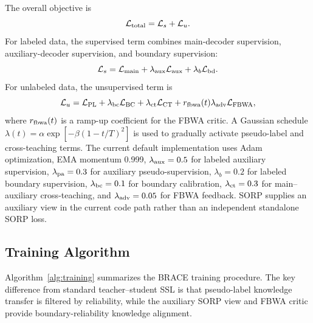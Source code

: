 \documentclass[a4paper,fleqn]{cas-dc}
\begin{document}
The overall objective is
\begin{equation}
\mathcal{L}_{\rm total}=\mathcal{L}_{s}+\mathcal{L}_{u}.
\end{equation}
For labeled data, the supervised term combines main-decoder supervision, auxiliary-decoder supervision, and boundary supervision:
\begin{equation}
\mathcal{L}_{s}=\mathcal{L}_{\rm main}+\lambda_{\rm aux}\mathcal{L}_{\rm aux}+\lambda_b\mathcal{L}_{\rm bd}.
\end{equation}
For unlabeled data, the unsupervised term is
\begin{equation}
\mathcal{L}_{u}=\mathcal{L}_{\rm PL}+\lambda_{\rm bc}\mathcal{L}_{\rm BC}+\lambda_{\rm ct}\mathcal{L}_{\rm CT}+r_{\rm fbwa}(t)\lambda_{\rm adv}\mathcal{L}_{\rm FBWA},
\end{equation}
where $r_{\rm fbwa}(t)$ is a ramp-up coefficient for the FBWA critic. A Gaussian schedule $\lambda(t)=\alpha\exp[-\beta(1-t/T)^2]$ is used to gradually activate pseudo-label and cross-teaching terms. The current default implementation uses Adam optimization, EMA momentum 0.999, $\lambda_{\rm aux}=0.5$ for labeled auxiliary supervision, $\lambda_{\rm pa}=0.3$ for auxiliary pseudo-supervision, $\lambda_b=0.2$ for labeled boundary supervision, $\lambda_{\rm bc}=0.1$ for boundary calibration, $\lambda_{\rm ct}=0.3$ for main--auxiliary cross-teaching, and $\lambda_{\rm adv}=0.05$ for FBWA feedback. SORP supplies an auxiliary view in the current code path rather than an independent standalone SORP loss.

\subsection{Training Algorithm}

Algorithm~\ref{alg:training} summarizes the BRACE training procedure. The key difference from standard teacher--student SSL is that pseudo-label knowledge transfer is filtered by reliability, while the auxiliary SORP view and FBWA critic provide boundary-reliability knowledge alignment.
\end{document}

